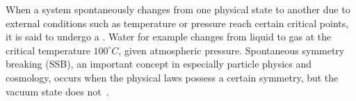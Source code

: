 


















 








When a system spontaneously changes from one physical state to another due to external conditions such as temperature or pressure reach certain critical points, it is said to undergo a . Water for example changes from liquid to gas at the critical temperature $100^\circ\unit{C}$, given atmospheric pressure. Spontaneous symmetry breaking (SSB), an important concept in especially particle physics and cosmology, occurs when the physical laws possess a certain symmetry, but the vacuum state does not~\citep{kolbEarlyUniverse1990}.

